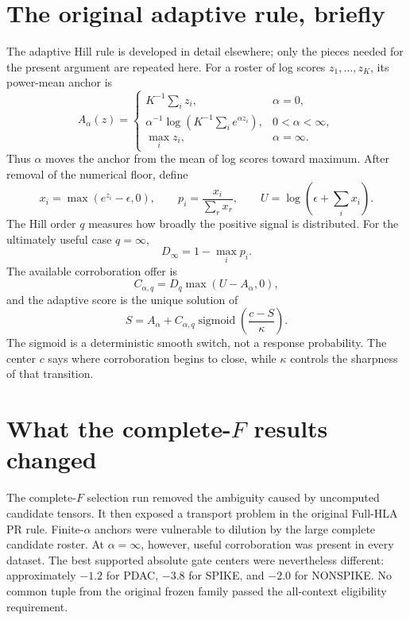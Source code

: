 \documentclass[11pt]{article}
\newcommand{\sigmoid}{\operatorname{sigmoid}}
\begin{document}
\section{The original adaptive rule, briefly}

The adaptive Hill rule is developed in detail elsewhere; only the pieces
needed for the present argument are repeated here. For a roster of log scores
$z_1,\ldots,z_K$, its power-mean anchor is
\begin{equation}
A_\alpha(z)=
\begin{cases}
K^{-1}\sum_i z_i, & \alpha=0,\\[3pt]
\alpha^{-1}\log\!\left(K^{-1}\sum_i e^{\alpha z_i}\right),
  & 0<\alpha<\infty,\\[3pt]
\max_i z_i, & \alpha=\infty.
\end{cases}
\end{equation}
Thus $\alpha$ moves the anchor from the mean of log scores toward maximum.
After removal of the numerical floor, define
\begin{equation}
x_i=\max(e^{z_i}-\epsilon,0),\qquad
p_i=\frac{x_i}{\sum_r x_r},\qquad
U=\log\!\left(\epsilon+\sum_i x_i\right).
\end{equation}
The Hill order $q$ measures how broadly the positive signal is distributed.
For the ultimately useful case $q=\infty$,
\begin{equation}
D_\infty=1-\max_i p_i.
\end{equation}
The available corroboration offer is
\begin{equation}
C_{\alpha,q}=D_q\max(U-A_\alpha,0),
\end{equation}
and the adaptive score is the unique solution of
\begin{equation}
S=A_\alpha+C_{\alpha,q}
\sigmoid\!\left(\frac{c-S}{\kappa}\right).
\label{eq:original-adaptive}
\end{equation}
The sigmoid is a deterministic smooth switch, not a response probability.
The center $c$ says where corroboration begins to close, while $\kappa$
controls the sharpness of that transition.

\section{What the complete-$F$ results changed}

The complete-$F$ selection run removed the ambiguity caused by uncomputed
candidate tensors. It then exposed a transport problem in the original
Full-HLA PR rule. Finite-$\alpha$ anchors were vulnerable to dilution by the
large complete candidate roster. At $\alpha=\infty$, however, useful
corroboration was present in every dataset. The best supported absolute gate
centers were nevertheless different: approximately $-1.2$ for PDAC, $-3.8$
for SPIKE, and $-2.0$ for NONSPIKE. No common tuple from the original frozen
family passed the all-context eligibility requirement.
\end{document}
